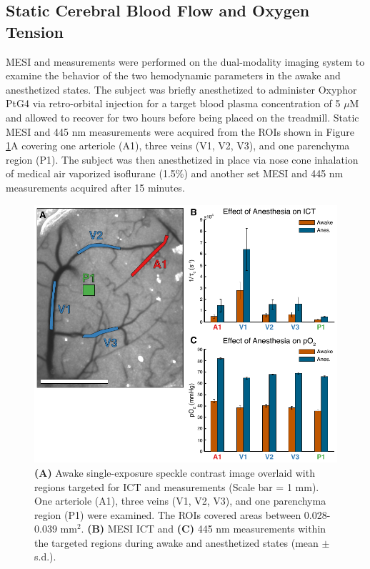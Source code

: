 \subsection{Static Cerebral Blood Flow and Oxygen Tension}

MESI and  measurements were performed on the dual-modality imaging system to examine the behavior of the two hemodynamic parameters in the awake and anesthetized states. The subject was briefly anesthetized to administer Oxyphor PtG4 via retro-orbital injection for a target blood plasma concentration of 5 $\mu$M and allowed to recover for two hours before being placed on the treadmill. Static MESI and 445 nm  measurements were acquired from the ROIs shown in Figure \ref{fig:specklepO2awakeanes}A covering one arteriole (A1), three veins (V1, V2, V3), and one parenchyma region (P1). The subject was then anesthetized in place via nose cone inhalation of medical air vaporized isoflurane (1.5\%) and another set MESI and 445 nm  measurements acquired after 15 minutes.

\begin{figure}
    \includegraphics{figures/chapter_5/specklepO2awakeanes.pdf}
    \caption{
        \label{fig:specklepO2awakeanes}
        \textbf{(A)} Awake single-exposure speckle contrast image overlaid with regions targeted for ICT and  measurements (Scale bar = 1 mm). One arteriole (A1), three veins (V1, V2, V3), and one parenchyma region (P1) were examined. The ROIs covered areas between 0.028-0.039 mm$^2$. \textbf{(B)} MESI ICT and \textbf{(C)} 445 nm  measurements within the targeted regions during awake and anesthetized states (mean $\pm$ s.d.).
    }
\end{figure}

